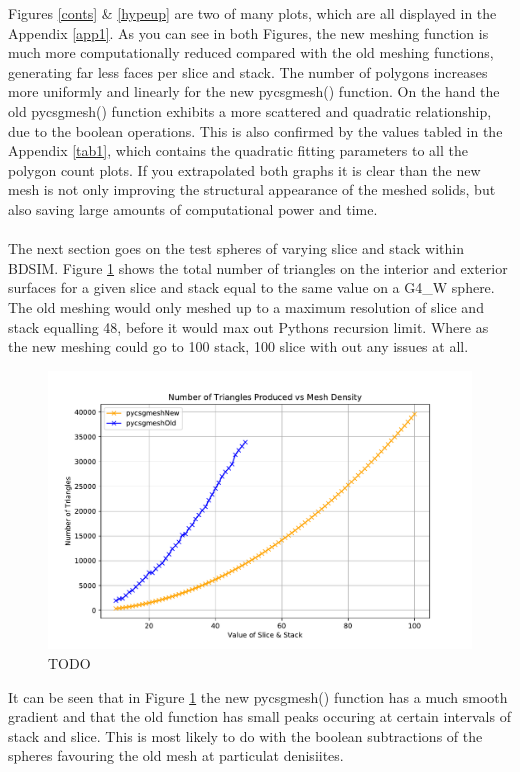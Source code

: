 \documentclass[12pt,a4paper]{article}
\begin{document}
\newpage
\noindent Figures \ref{conts} \& \ref{hypeup} are two of many plots, which are all displayed in the Appendix \ref{app1}. As you can see in  both Figures, the new meshing function is much more computationally reduced compared with the old meshing functions, generating far less faces per slice and stack. The number of polygons increases more uniformly and linearly for the new pycsgmesh() function. On the hand the old pycsgmesh() function exhibits a more scattered and quadratic relationship, due to the boolean operations. This is also confirmed by the values tabled in the Appendix \ref{tab1}, which contains the quadratic fitting parameters to all the polygon count plots. If you extrapolated both graphs it is clear than the new mesh is not only improving the structural appearance of the meshed solids, but also saving large amounts of computational power and time.
\\\\
\noindent The next section goes on the test spheres of varying slice and stack within BDSIM. Figure \ref{tritri} shows the total number of triangles on the interior and exterior surfaces for a given slice and stack equal to the same value on a G4\_W sphere. The old meshing would only meshed up to a maximum resolution of slice and stack equalling 48, before it would max out Pythons recursion limit. Where as the new meshing could go to 100 stack, 100 slice with out any issues at all.

\begin{figure}[h!]
\centering
\includegraphics[scale=0.5]{Images//Triangles//MeshvTRi1.pdf}
\caption[width=\columnwidth]{TODO}
\label{tritri}
\end{figure}

\noindent It can be seen that in Figure \ref{tritri} the new pycsgmesh() function has a much smooth gradient and that the old function has small peaks occuring at certain intervals of stack and slice. This is most likely to do with the boolean subtractions of the spheres favouring the old mesh at particulat denisiites.
\end{document}
